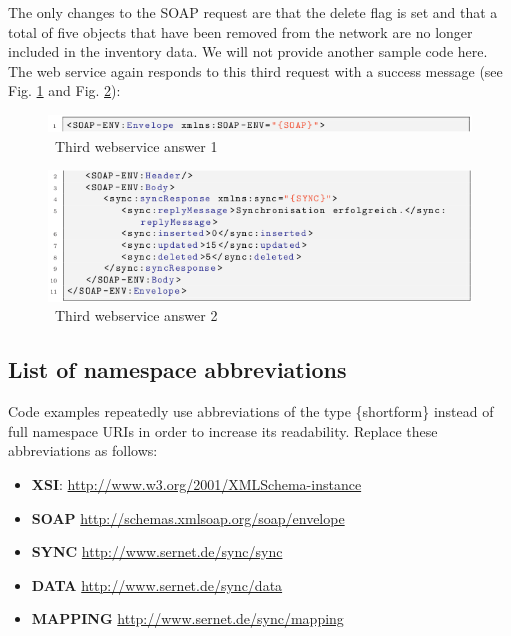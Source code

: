 \documentclass[a4paper,10pt]{book}
\begin{document}
\newline
The only changes to the SOAP request are that the delete flag is set and that a total of five objects that have been removed from the
network are no longer included in the inventory data. We will not provide another sample code here.
\newline\\
The web service again responds to this third request with a success message (see Fig. \ref{Third webservice answer 1} and Fig. \ref{Third webservice answer 2}):
\newline
\begin{figure}[htb!]
  \centering
  \includegraphics[scale=.7]{Screenshot/SyncAPI_Fallstudie_13-en.png}
  \caption{\label{Third webservice answer 1} \ Third webservice answer 1}
\end{figure}
\newline
\begin{figure}[htb!]
  \centering
  \includegraphics[scale=.7]{Screenshot/SyncAPI_Fallstudie_14-en.png}
  \caption{\label{Third webservice answer 2} \ Third webservice answer 2}
\end{figure}
\newline

\subsection{ List of namespace abbreviations}
Code examples repeatedly use abbreviations of the type \{shortform\} instead
of full namespace URIs in order to increase its readability. Replace these abbreviations as follows:
\begin{itemize}
 \item \textbf{XSI}: \href{http://www.w3.org/2001/XMLSchema-instance}{http://www.w3.org/2001/XMLSchema-instance}
 \item \textbf{SOAP} \href{http://schemas.xmlsoap.org/soap/envelope}{http://schemas.xmlsoap.org/soap/envelope}
 \item \textbf{SYNC} \href{http://www.sernet.de/sync/sync}{http://www.sernet.de/sync/sync}
 \item \textbf{DATA} \href{http://www.sernet.de/sync/data}{http://www.sernet.de/sync/data}
 \item \textbf{MAPPING} \href{http://www.sernet.de/sync/mapping}{http://www.sernet.de/sync/mapping}
\end{itemize}
\end{document}
